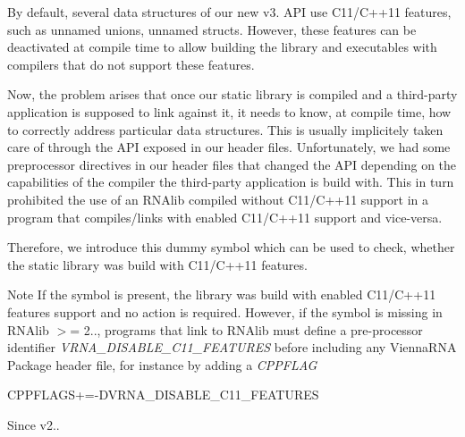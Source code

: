 By default, several data structures of our new v3. A\+PI use C11/\+C++11 features, such as unnamed unions, unnamed structs. However, these features can be deactivated at compile time to allow building the library and executables with compilers that do not support these features.

Now, the problem arises that once our static library is compiled and a third-\/party application is supposed to link against it, it needs to know, at compile time, how to correctly address particular data structures. This is usually implicitely taken care of through the A\+PI exposed in our header files. Unfortunately, we had some preprocessor directives in our header files that changed the A\+PI depending on the capabilities of the compiler the third-\/party application is build with. This in turn prohibited the use of an R\+N\+Alib compiled without C11/\+C++11 support in a program that compiles/links with enabled C11/\+C++11 support and vice-\/versa.

Therefore, we introduce this dummy symbol which can be used to check, whether the static library was build with C11/\+C++11 features.

\begin{DoxyNote}{Note}
If the symbol is present, the library was build with enabled C11/\+C++11 features support and no action is required. However, if the symbol is missing in R\+N\+Alib $>$= 2.., programs that link to R\+N\+Alib must define a pre-\/processor identifier {\itshape V\+R\+N\+A\+\_\+\+D\+I\+S\+A\+B\+L\+E\+\_\+\+C11\+\_\+\+F\+E\+A\+T\+U\+R\+ES} before including any Vienna\+R\+NA Package header file, for instance by adding a {\itshape C\+P\+P\+F\+L\+AG} 
\begin{DoxyCode}
CPPFLAGS+=-DVRNA\_DISABLE\_C11\_FEATURES
\end{DoxyCode}

\end{DoxyNote}
\begin{DoxySince}{Since}
v2.. 
\end{DoxySince}
